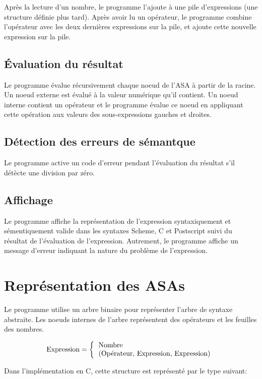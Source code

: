\documentclass[10pt]{report}
\begin{document}
Après la lecture d'un nombre, le programme l'ajoute à une pile d'expressions
(une structure définie plus tard).  Après avoir lu un opérateur, le programme
combine l'opérateur avec les deux dernières expressions sur la pile, et ajoute
cette nouvelle expression sur la pile.

\subsection{Évaluation du résultat}

Le programme évalue récursivement chaque noeud de l'ASA à partir de la
racine. Un noeud externe est évalué à la valeur numérique qu'il contient. Un
noeud interne contient un opérateur et le programme évalue ce noeud en
appliquant cette opération aux valeurs des sous-expressions gauches et
droites.

\subsection{Détection des erreurs de sémantque}

Le programme active un code d'erreur pendant l'évaluation du résultat s'il
détècte une division par zéro.


\subsection{Affichage}

Le programme affiche la représentation de l'expression syntaxiquement et
sémentiquement valide dans les syntaxes Scheme, C et Postscript suivi du
résultat de l'évaluation de l'expression.  Autrement, le programme affiche un
message d'erreur indiquant la nature du problème de l'expression.


\section{Représentation des ASAs}

Le programme utilise un arbre binaire pour représenter l'arbre de syntaxe
abstraite. Les noeuds internes de l'arbre représentent des opérateurs et les
feuilles des nombres.

\[
\text{Expression} =
\left\{
\begin{tabular}{l}
  \text{Nombre} \\
  \text{(Opérateur, Expression, Expression)}
\end{tabular}
\right.
\]

Dans l'implémentation en C, cette structure est représenté par le type
suivant:
\end{document}
